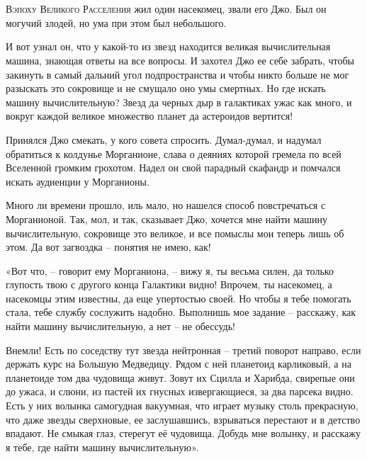 \documentclass[ebook,oneside,final,openright]{memoir}
\begin{document}
\chapter{}
 \lettrine{В}{эпоху Великого Расселения} жил один насекомец, звали его Джо. Был он могучий злодей, но ума при этом был небольшого.\par
\par
И вот узнал он, что у какой-то из звезд находится великая вычислительная машина, знающая ответы на все вопросы. И захотел Джо ее себе забрать, чтобы закинуть в самый дальний угол подпространства и чтобы никто больше не мог разыскать это сокровище и не смущало оно умы смертных. Но где искать машину вычислительную? Звезд да черных дыр в галактиках ужас как много, и вокруг каждой великое множество планет да астероидов вертится!\par
\par
Принялся Джо смекать, у кого совета спросить. Думал-думал, и надумал обратиться к колдунье Морганионе, слава о деяниях которой гремела по всей Вселенной громким грохотом. Надел он свой парадный скафандр и помчался искать аудиенции у Морганионы.\par
\par
Много ли времени прошло, иль мало, но нашелся способ повстречаться с Морганионой. Так, мол, и так, сказывает Джо, хочется мне найти машину вычислительную, сокровище это великое, и все помыслы мои теперь лишь об этом. Да вот загвоздка – понятия не имею, как!\par
\par
«Вот что, – говорит ему Морганиона, – вижу я, ты весьма силен, да только глупость твою с другого конца Галактики видно! Впрочем, ты насекомец, а насекомцы этим известны, да еще упертостью своей. Но чтобы я тебе помогать стала, тебе службу сослужить надобно. Выполнишь мое задание – расскажу, как найти машину вычислительную, а нет – не обессудь!\par
\par
Внемли! Есть по соседству тут звезда нейтронная – третий поворот направо, если держать курс на Большую Медведицу. Рядом с ней планетоид карликовый, а на планетоиде том два чудовища живут. Зовут их Сцилла и Харибда, свирепые они до ужаса, и слюни, из пастей их гнусных извергающиеся, за два парсека видно. Есть у них волынка самогудная вакуумная, что играет музыку столь прекрасную, что даже звезды сверхновые, ее заслушавшись, взрываться перестают и в детство впадают. Не смыкая глаз, стерегут её чудовища. Добудь мне волынку, и расскажу я тебе, где найти машину вычислительную».\par
\end{document}
